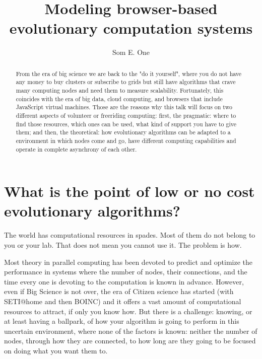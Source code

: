 \documentclass[a4paper]{article}
\begin{document}
\title{Modeling browser-based evolutionary computation systems}
\author{Som E. One}



\maketitle

\begin{abstract}
From the era of big science we are back to the "do it yourself", where
you do not have any money to buy clusters or subscribe to grids but
still have algorithms that crave many computing nodes and need them to
measure scalability. Fortunately, this coincides with the era of big
data, cloud computing, and browsers that include JavaScript virtual
machines. Those are the reasons why this talk will focus on two
different aspects of volunteer or freeriding computing: first, the
pragmatic: where to find those resources, which ones can be used, what
kind of support you have to give them; and then, the theoretical: how
evolutionary algorithms can be adapted to a environment in which nodes
come and go, have different computing capabilities and operate in
complete asynchrony of each other. 
\end{abstract}

\section{What is the point of low or no cost evolutionary algorithms?}

The world has computational resources in spades. Most of them do not belong to you or your lab. That does not mean you cannot use it. The problem is how.

Most theory in parallel computing has been devoted to predict and optimize the performance in systems where the number of nodes, their connections, and the time every one is devoting to the computation is known in advance. However, even if Big Science is not over, the era of Citizen science has started (with SETI@home and then BOINC) and it offers a vast amount of computational resources to attract, if only you know how. But there is a challenge: knowing, or at least having a ballpark, of how your algorithm is going to perform in this uncertain environment, where none of the factors is known: neither the number of nodes, through how they are connected, to how long are they going to be focused on doing what you want them to.
\end{document}
